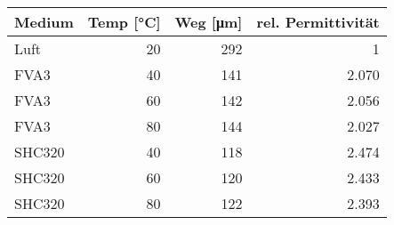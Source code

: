 \begin{tabular}{lrrr}
    Medium & Temp [\si{\degreeCelsius}] & Weg [\si{\um}] & rel. Permittivität \\
    \hline
    Luft   & 20                         & 292            & 1                  \\
    FVA3   & 40                         & 141            & 2.070              \\
    FVA3   & 60                         & 142            & 2.056              \\
    FVA3   & 80                         & 144            & 2.027              \\
    SHC320 & 40                         & 118            & 2.474              \\
    SHC320 & 60                         & 120            & 2.433              \\
    SHC320 & 80                         & 122            & 2.393              \\
\end{tabular}
